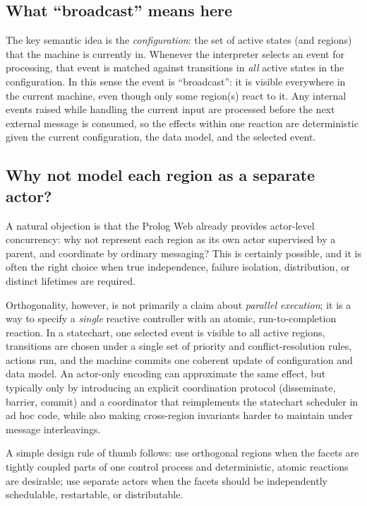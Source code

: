 \subsection{What ``broadcast'' means here}

The key semantic idea is the \emph{configuration}: the set of active states (and regions) that the machine is currently in. Whenever the interpreter selects an event for processing, that event is matched against transitions in \emph{all} active states in the configuration. In this sense the event is ``broadcast'': it is visible everywhere in the current machine, even though only some region(s) react to it. Any internal events raised while handling the current input are processed before the next external message is consumed, so the effects within one reaction are deterministic given the current configuration, the data model, and the selected event.

\subsection{Why not model each region as a separate actor?}

A natural objection is that the Prolog Web already provides actor-level concurrency: why not represent each region as its own actor supervised by a parent, and coordinate by ordinary messaging? This is certainly possible, and it is often the right choice when true independence, failure isolation, distribution, or distinct lifetimes are required.

Orthogonality, however, is not primarily a claim about \emph{parallel execution}; it is a way to specify a \emph{single} reactive controller with an atomic, run-to-completion reaction. In a statechart, one selected event is visible to all active regions, transitions are chosen under a single set of priority and conflict-resolution rules, actions run, and the machine commits one coherent update of configuration and data model. An actor-only encoding can approximate the same effect, but typically only by introducing an explicit coordination protocol (disseminate, barrier, commit) and a coordinator that reimplements the statechart scheduler in ad hoc code, while also making cross-region invariants harder to maintain under message interleavings.

A simple design rule of thumb follows: use orthogonal regions when the facets are tightly coupled parts of one control process and deterministic, atomic reactions are desirable; use separate actors when the facets should be independently schedulable, restartable, or distributable.


